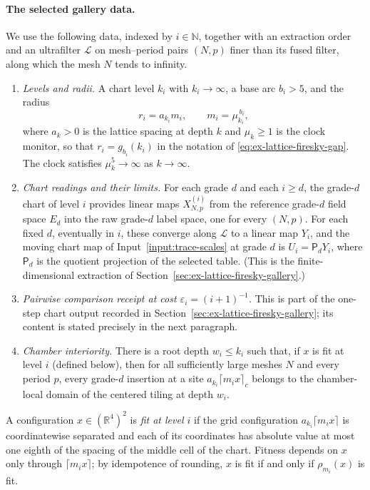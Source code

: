\paragraph{The selected gallery data.}
We use the following data, indexed by $i\in\mathbb N$, together with an
extraction order and an ultrafilter $\mathcal L$ on mesh--period pairs
$(N,p)$ finer than its fused filter, along which the mesh $N$ tends to
infinity.
\begin{enumerate}
\item[(G1)] \emph{Levels and radii.} A chart level $k_i$ with
 $k_i\to\infty$, a base arc $b_i>5$, and the radius
 \[
  r_i=a_{k_i}m_i,\qquad m_i=\mu_{k_i}^{\,b_i},
 \]
 where $a_k>0$ is the lattice spacing at depth $k$ and $\mu_k\ge1$ is the
 clock monitor, so that $r_i=g_{b_i}(k_i)$ in the notation of
 \eqref{eq:ex-lattice-firesky-gap}. The clock satisfies
 $\mu_k^5\to\infty$ as $k\to\infty$.
\item[(G2)] \emph{Chart readings and their limits.} For each grade $d$
 and each $i\ge d$, the grade-$d$ chart of level $i$ provides linear maps
 $X^{(i)}_{N,p}$ from the reference grade-$d$ field space $E_d$ into the
 raw grade-$d$ label space, one for every $(N,p)$. For each fixed $d$,
 eventually in $i$, these converge along $\mathcal L$ to a linear map
 $Y_{i}$, and the moving chart map of
 Input~\ref{input:trace-scales} at grade $d$ is
 $U_i=\mathsf P_dY_i$, where $\mathsf P_d$ is the quotient projection of
 the selected table. (This is the finite-dimensional extraction of
 Section~\ref{sec:ex-lattice-firesky-gallery}.)
\item[(G3)] \emph{Pairwise comparison receipt at cost
 $\varepsilon_i=(i+1)^{-1}$.} This is part of the one-step chart output
 recorded in Section~\ref{sec:ex-lattice-firesky-gallery}; its content is
 stated precisely in the next paragraph.
\item[(G4)] \emph{Chamber interiority.} There is a root depth
 $w_i\le k_i$ such that, if $x$ is fit at level $i$ (defined below), then
 for all sufficiently large meshes $N$ and every period $p$, every
 grade-$d$ insertion at a site $a_{k_i}\lceil m_ix\rceil_c$ belongs to the
 chamber-local domain of the centered tiling at depth $w_i$.
\end{enumerate}
A configuration $x\in(\mathbb R^4)^2$ is \emph{fit at level $i$} if the
grid configuration $a_{k_i}\lceil m_ix\rceil$ is coordinatewise
separated and each of its coordinates has absolute value at most one
eighth of the spacing of the middle cell of the chart. Fitness depends on
$x$ only through $\lceil m_ix\rceil$; by idempotence of rounding, $x$ is
fit if and only if $\rho_{m_i}(x)$ is fit.

